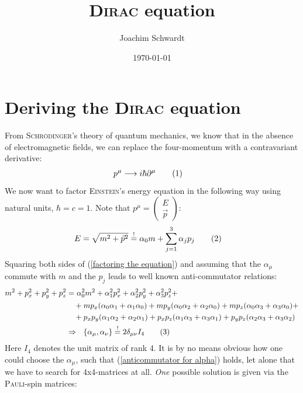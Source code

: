\documentclass[a4paper,12pt]{article}
\newcommand\numberthis{\addtocounter{equation}{1}\tag{\theequation}}
\newcommand{\klammer}{}
\begin{document}
\title{\textsc{Dirac} equation}
\author{Joachim Schwardt}
\date{\today}
\maketitle

\section{Deriving the \textsc{Dirac} equation}
From \textsc{Schrödinger}'s theory of quantum mechanics, we know that in the absence of electromagnetic fields, we can replace the four-momentum with a contravariant derivative:
\begin{align*}
p^\mu&\longrightarrow i\hbar\partial^\mu\numberthis\label{replacement rule momentum}
\end{align*} 
We now want to factor \textsc{Einstein}'s energy equation in the following way using natural units, $\hbar=c=1$. Note that $p^\mu=\begin{pmatrix} E \\ \vec{p} \end{pmatrix}$:
\begin{align*}
E&=\sqrt{m^2+\vec{p}^2}\overset{!}{=}\alpha_0m+\sum_{j=1}^3\alpha_jp_j\numberthis\label{factoring the equation}
\end{align*}
Squaring both sides of (\ref{factoring the equation}) and assuming that the $\alpha_\mu$ commute with $m$ and the $p_j$ leads to well known anti-commutator relations:
\begin{align*}
m^2+p_x^2+p_y^2+p_z^2&=\alpha_0^2m^2 + \alpha_1^2p_x^2 + \alpha_2^2p_y^2 + \alpha_3^2p_z^2+\\
&\ \ \ +mp_x(\alpha_0\alpha_1+\alpha_1\alpha_0) +mp_y(\alpha_0\alpha_2+\alpha_2\alpha_0) +mp_z(\alpha_0\alpha_3+\alpha_3\alpha_0)+\\
&\ \ \ +p_xp_y(\alpha_1\alpha_2+\alpha_2\alpha_1) +p_xp_z(\alpha_1\alpha_3+\alpha_3\alpha_1)+p_yp_z(\alpha_2\alpha_3+\alpha_3\alpha_2)\\
&\Rightarrow\ \ \klammer\left\{{\alpha_\mu,\alpha_\nu} \right\}\overset{!}{=}2\delta_{\mu\nu}I_4\numberthis\label{anticommutator for alpha}
\end{align*}
Here $I_4$ denotes the unit matrix of rank 4. It is by no means obvious how one could choose the $\alpha_\mu$, such that (\ref{anticommutator for alpha}) holds, let alone that we have to search for 4x4-matrices at all. \textsl{One} possible solution is given via the \textsc{Pauli}-spin matrices:
\end{document}
